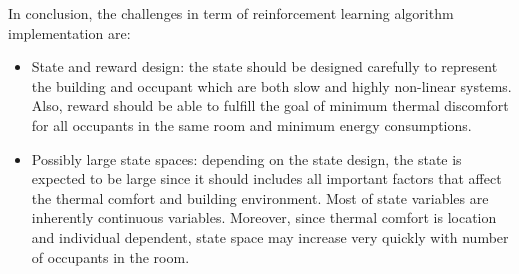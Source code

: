 \documentclass{article}
\begin{document}
  
 
 
 
 In conclusion, the challenges in term of reinforcement learning algorithm implementation are:
\begin{itemize}
	\item State and reward design: the state should be designed carefully to represent the building and occupant which are both slow and highly non-linear systems. Also, reward should be able to fulfill the goal of minimum thermal discomfort for all occupants in the same room and minimum energy consumptions. 
	
	\item Possibly large state spaces: depending on the state design, the state is expected to be large since it should includes all important factors that affect the thermal comfort and building environment. Most of state variables are inherently continuous variables. Moreover, since thermal comfort is location and individual dependent, state space may increase very quickly with number of occupants in the room. 
	
	
	

	
\end{itemize}
\end{document}
